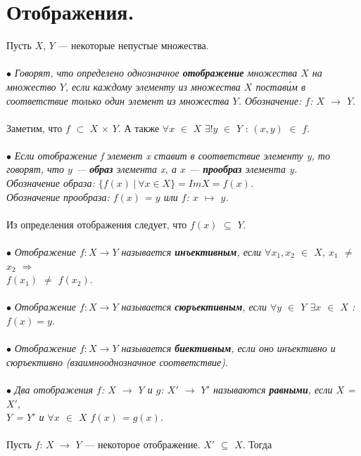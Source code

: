 \section{Отображения.}
Пусть $X$, $Y$ --- некоторые непустые множества.\\\\
$\bullet$ \textit{Говорят, что определено однозначное \textbf{отображение} множества $X$ на множество $Y$, если каждому элементу из множества $X$ постав\'{и}м в соответствие только один элемент из множества $Y$. Обозначение: $f$: $X$ $\rightarrow$ $Y$}.\\\\
Заметим, что $f$ $\subset$ $X$ $\times$ $Y$. А также $\forall x$ $\in$ $X$ $\exists!y$ $\in$ $Y$ : $(x,y)$ $\in$ $f$.\\\\
$\bullet$ \textit{Если отображение f элемент x ставит в соответствие элементу y, то говорят, что $y$ --- \textbf{образ} элемента x, а $x$ --- \textbf{прообраз} элемента y. \\Обозначение образа: $\{f(x)\ |\ \forall x\in X \} = ImX = f(x)$.\\
	Обозначение прообраза: $f(x)$ = $y$ или $f$: $x$ $\mapsto$ $y$.}\\\\
Из определения отображения следует, что $f(x)$ $\subseteq$ $Y$.\\\\
$\bullet$ \textit{Отображение $f: X\rightarrow Y$ называется \textbf{инъективным}, если $\forall x_1, x_2$ $\in$ $X$, $x_1$ $\not=$ $x_2$ $\Rightarrow$ \\ $f(x_1)$ $\not=$ $f(x_2)$}.\\\\
$\bullet$ \textit{Отображение $f: X\rightarrow Y$ называется \textbf{сюръективным}, если $\forall$$y$ $\in$ $Y$  $\exists$$x$ $\in$ $X$ : $f(x) = y$}.\\\\
$\bullet$ \textit{Отображение $f: X\rightarrow Y$ называется \textbf{биективным}, если оно инъективно и сюръективно} \textit{(взаимнооднозначное соответствие)}.\\\\
$\bullet$ \textit{Два отображения $f$: $X$ $\rightarrow$ $Y$ и $g$: $X'$ $\rightarrow$ $Y'$ называются \textbf{равными}, если $X$ = $X'$}, \\ \textit{$Y$ = $Y'$ и $\forall x$ $\in$ $X$ $f(x)$ = $g(x)$.}\\\\
Пусть $f$: $X$ $\rightarrow$ $Y$ --- некоторое отображение. $X'$ $\subseteq$ $X$. Тогда \\\\
